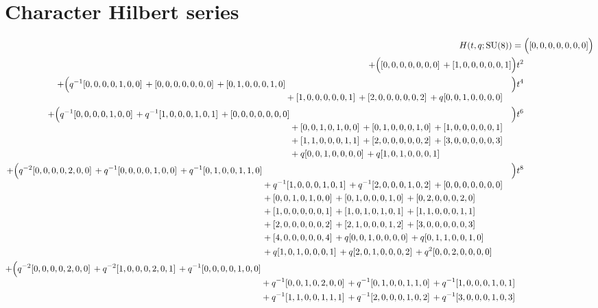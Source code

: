 \documentclass[10pt]{article}
\begin{document}
\section{Character Hilbert series}
\[
\begin{aligned}
H(t,q;\mathrm{SU}(8)) ={}&
   \Bigl([0,0,0,0,0,0,0]\Bigr) \\
  + \Bigl([0,0,0,0,0,0,0]\,+[1,0,0,0,0,0,1]\Bigr)t^{2} \\
  + \Bigl(\begin{aligned}[t]q^{-1}[0,0,0,0,1,0,0]\,+[0,0,0,0,0,0,0]\,+[0,1,0,0,0,1,0] \\
  &{}+[1,0,0,0,0,0,1]\,+[2,0,0,0,0,0,2]\,+q[0,0,1,0,0,0,0]\end{aligned}\Bigr)t^{4} \\
  + \Bigl(\begin{aligned}[t]q^{-1}[0,0,0,0,1,0,0]\,+q^{-1}[1,0,0,0,1,0,1]\,+[0,0,0,0,0,0,0] \\
  &{}+[0,0,1,0,1,0,0]\,+[0,1,0,0,0,1,0]\,+[1,0,0,0,0,0,1] \\
  &{}+[1,1,0,0,0,1,1]\,+[2,0,0,0,0,0,2]\,+[3,0,0,0,0,0,3] \\
  &{}+q[0,0,1,0,0,0,0]\,+q[1,0,1,0,0,0,1]\end{aligned}\Bigr)t^{6} \\
  + \Bigl(\begin{aligned}[t]q^{-2}[0,0,0,0,2,0,0]\,+q^{-1}[0,0,0,0,1,0,0]\,+q^{-1}[0,1,0,0,1,1,0] \\
  &{}+q^{-1}[1,0,0,0,1,0,1]\,+q^{-1}[2,0,0,0,1,0,2]\,+[0,0,0,0,0,0,0] \\
  &{}+[0,0,1,0,1,0,0]\,+[0,1,0,0,0,1,0]\,+[0,2,0,0,0,2,0] \\
  &{}+[1,0,0,0,0,0,1]\,+[1,0,1,0,1,0,1]\,+[1,1,0,0,0,1,1] \\
  &{}+[2,0,0,0,0,0,2]\,+[2,1,0,0,0,1,2]\,+[3,0,0,0,0,0,3] \\
  &{}+[4,0,0,0,0,0,4]\,+q[0,0,1,0,0,0,0]\,+q[0,1,1,0,0,1,0] \\
  &{}+q[1,0,1,0,0,0,1]\,+q[2,0,1,0,0,0,2]\,+q^{2}[0,0,2,0,0,0,0]\end{aligned}\Bigr)t^{8} \\
  + \Bigl(\begin{aligned}[t]q^{-2}[0,0,0,0,2,0,0]\,+q^{-2}[1,0,0,0,2,0,1]\,+q^{-1}[0,0,0,0,1,0,0] \\
  &{}+q^{-1}[0,0,1,0,2,0,0]\,+q^{-1}[0,1,0,0,1,1,0]\,+q^{-1}[1,0,0,0,1,0,1] \\
  &{}+q^{-1}[1,1,0,0,1,1,1]\,+q^{-1}[2,0,0,0,1,0,2]\,+q^{-1}[3,0,0,0,1,0,3] \\

\end{aligned}
\end{aligned}\]
\end{document}
